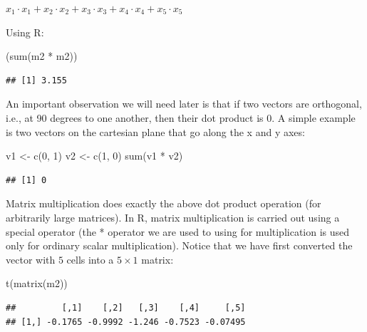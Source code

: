 \documentclass[
  12pt,
]{krantz}
\newenvironment{Shaded}{\begin{snugshade}}{\end{snugshade}}
\newcommand{\DecValTok}[1]{\textcolor[rgb]{0.00,0.00,0.81}{#1}}
\newcommand{\FunctionTok}[1]{\textcolor[rgb]{0.00,0.00,0.00}{#1}}
\newcommand{\NormalTok}[1]{#1}
\newcommand{\OtherTok}[1]{\textcolor[rgb]{0.56,0.35,0.01}{#1}}
\newcommand{\SpecialCharTok}[1]{\textcolor[rgb]{0.00,0.00,0.00}{#1}}
\theoremstyle{definition}
\theoremstyle{definition}
\theoremstyle{definition}
\theoremstyle{definition}
\theoremstyle{remark}
\begin{document}
\(x_1 \cdot x_1+x_2 \cdot x_2+x_3 \cdot x_3+x_4 \cdot x_4+x_5 \cdot x_5\)

Using R:

\begin{Shaded}
\begin{Highlighting}[]
\NormalTok{(}\FunctionTok{sum}\NormalTok{(m2 }\SpecialCharTok{*}\NormalTok{ m2))}
\end{Highlighting}
\end{Shaded}

\begin{verbatim}
## [1] 3.155
\end{verbatim}

An important observation we will need later is that if two vectors are orthogonal, i.e., at 90 degrees to one another, then their dot product is 0. A simple example is two vectors on the cartesian plane that go along the x and y axes:

\begin{Shaded}
\begin{Highlighting}[]
\NormalTok{v1 }\OtherTok{\textless{}{-}} \FunctionTok{c}\NormalTok{(}\DecValTok{0}\NormalTok{, }\DecValTok{1}\NormalTok{)}
\NormalTok{v2 }\OtherTok{\textless{}{-}} \FunctionTok{c}\NormalTok{(}\DecValTok{1}\NormalTok{, }\DecValTok{0}\NormalTok{)}
\FunctionTok{sum}\NormalTok{(v1 }\SpecialCharTok{*}\NormalTok{ v2)}
\end{Highlighting}
\end{Shaded}

\begin{verbatim}
## [1] 0
\end{verbatim}

Matrix multiplication does exactly the above dot product operation (for arbitrarily large matrices). In R, matrix multiplication is carried out using a special operator (the * operator we are used to using for multiplication is used only for ordinary scalar multiplication). Notice that we have first converted the vector with \(5\) cells into a \(5\times 1\) matrix:

\begin{Shaded}
\begin{Highlighting}[]
\FunctionTok{t}\NormalTok{(}\FunctionTok{matrix}\NormalTok{(m2))}
\end{Highlighting}
\end{Shaded}

\begin{verbatim}
##         [,1]    [,2]   [,3]    [,4]     [,5]
## [1,] -0.1765 -0.9992 -1.246 -0.7523 -0.07495
\end{verbatim}
\end{document}
